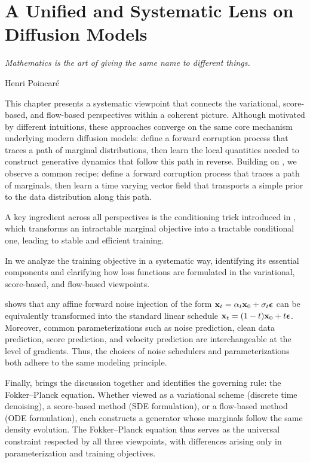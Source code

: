 \chapter{A Unified and Systematic Lens on Diffusion Models}\label{ch:all-equivalent} 

\epigraph{
    \textit{Mathematics is the art of giving the same name to different things.
}}{Henri Poincaré}

This chapter presents a systematic viewpoint that connects the variational, score-based, and flow-based perspectives within a coherent picture. Although motivated by different intuitions, these approaches converge on the same core mechanism underlying modern diffusion models: define a forward corruption process that traces a path of marginal distributions, then learn the local
quantities needed to construct generative dynamics that follow this path in reverse. Building on , we observe a common recipe: define a forward corruption process that traces a path of marginals, then learn a time varying vector field that transports a simple prior to the data distribution along this path.

A key ingredient across all perspectives is the conditioning trick introduced in , which transforms an intractable marginal objective into a tractable conditional one, leading to stable and efficient training.

In  we analyze the training objective in a systematic way, identifying its essential components and clarifying how loss functions are formulated in the variational, score-based, and flow-based viewpoints.


 shows that any affine forward noise injection of the form ${\mathbf{x}}_t = \alpha_t {\mathbf{x}}_0 + \sigma_t {\bm{\epsilon}}$ can be equivalently transformed into the standard linear schedule ${\mathbf{x}}_t = (1 - t){\mathbf{x}}_0 + t{\bm{\epsilon}}$. Moreover, common parameterizations such as noise prediction, clean data prediction, score prediction, and velocity prediction are interchangeable at the level of gradients. Thus, the choices of noise schedulers and parameterizations both adhere to the same  modeling principle.



Finally,  brings the discussion together and identifies the governing rule: the Fokker–Planck equation. Whether viewed as a variational scheme (discrete time denoising), a score-based method (SDE formulation), or a flow-based method (ODE formulation), each constructs a generator whose marginals follow the same density evolution. The Fokker–Planck equation thus serves as the universal constraint respected by all three viewpoints, with differences arising only in parameterization and training objectives.

